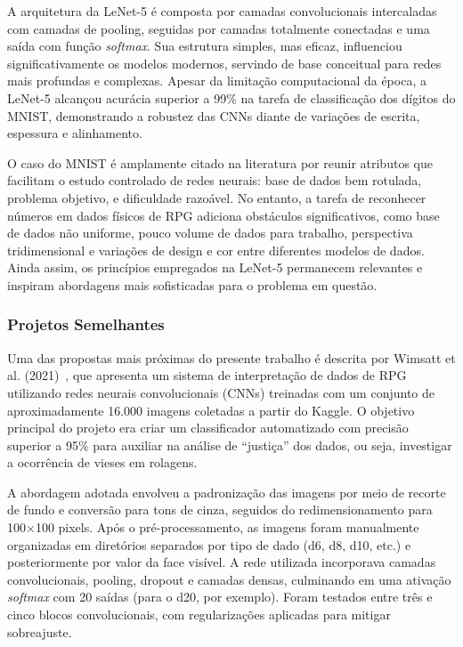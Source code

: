 A arquitetura da LeNet-5 é composta por camadas convolucionais intercaladas com camadas de pooling, seguidas por camadas totalmente 
conectadas e uma saída com função \textit{softmax}. Sua estrutura simples, mas eficaz, influenciou significativamente os modelos modernos, 
servindo de base conceitual para redes mais profundas e complexas. Apesar da limitação computacional da época, a LeNet-5 alcançou acurácia 
superior a 99\% na tarefa de classificação dos dígitos do MNIST, demonstrando a robustez das CNNs diante de variações de escrita, espessura 
e alinhamento.

O caso do MNIST é amplamente citado na literatura por reunir atributos que facilitam o estudo controlado de redes neurais: base de dados 
bem rotulada, problema objetivo, e dificuldade razoável. No entanto, a tarefa de reconhecer números em dados físicos de RPG adiciona 
obstáculos significativos, como base de dados não uniforme, pouco volume de dados para trabalho, perspectiva tridimensional e variações de design 
e cor entre diferentes modelos de dados. Ainda assim, os princípios empregados na LeNet-5 permanecem relevantes e inspiram abordagens mais sofisticadas 
para o problema em questão.

\subsubsection{Projetos Semelhantes}

Uma das propostas mais próximas do presente trabalho é descrita por Wimsatt et al. (2021)~\cite{wimsatt2021dice}, que apresenta um sistema 
de interpretação de dados de RPG utilizando redes neurais convolucionais (CNNs) treinadas com um conjunto de aproximadamente 16.000 imagens 
coletadas a partir do Kaggle. O objetivo principal do projeto era criar um classificador automatizado com precisão superior a 95\% para 
auxiliar na análise de “justiça” dos dados, ou seja, investigar a ocorrência de vieses em rolagens.

A abordagem adotada envolveu a padronização das imagens por meio de recorte de fundo e conversão para tons de cinza, seguidos do 
redimensionamento para 100×100 pixels. Após o pré-processamento, as imagens foram manualmente organizadas em diretórios separados 
por tipo de dado (d6, d8, d10, etc.) e posteriormente por valor da face visível. A rede utilizada incorporava camadas convolucionais, 
pooling, dropout e camadas densas, culminando em uma ativação \textit{softmax} com 20 saídas (para o d20, por exemplo). Foram testados 
entre três e cinco blocos convolucionais, com regularizações aplicadas para mitigar sobreajuste.


